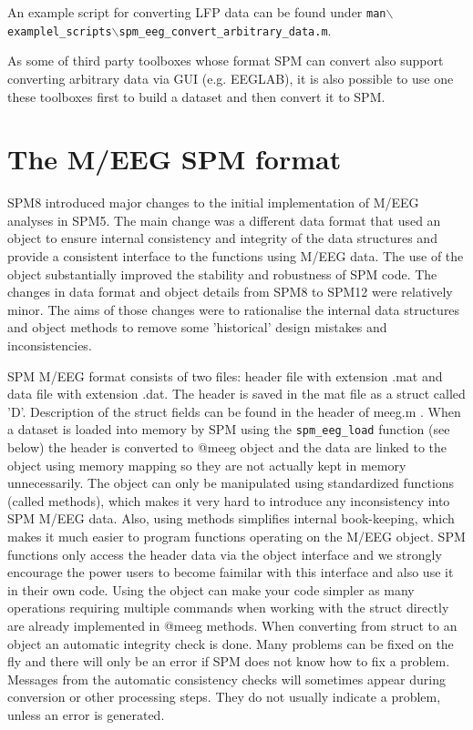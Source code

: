 An example script for converting LFP data can be found under \texttt{man$\backslash$examplel\_scripts$\backslash$spm\_eeg\_convert\_arbitrary\_data.m}.

As some of third party toolboxes whose format SPM can convert also support converting arbitrary data via GUI (e.g. EEGLAB), it is also possible to use one these toolboxes first to build a dataset and then convert it to SPM. 

\section{The M/EEG SPM format}
SPM8 introduced major changes to the initial implementation of M/EEG analyses in SPM5. The main change was a different data format that used an object to ensure internal consistency and integrity of the data structures and provide a consistent interface to the functions using M/EEG data. The use of the object substantially improved  the stability and robustness of SPM code. The changes in data format and object details from SPM8 to SPM12 were relatively minor. The aims of those changes were to rationalise the internal data  structures and object methods to remove some 'historical' design mistakes and inconsistencies.

SPM M/EEG format consists of two files: header file with extension .mat and data file with extension .dat. The header is saved in the mat file as a struct called 'D'. Description of the struct fields can be found in the header of meeg.m . When a dataset is loaded into memory by SPM using the \texttt{spm\_eeg\_load} function (see below) the header is converted to @meeg object and the data are linked to the object using memory mapping so they are not actually kept in memory unnecessarily. The object can only be manipulated using standardized functions (called methods), which makes it very hard to introduce any inconsistency into SPM M/EEG data. Also, using methods simplifies internal book-keeping, which makes it much easier to program functions operating on the M/EEG object. SPM functions only access the header data via the object interface and we strongly encourage the power users to become faimilar with this interface and also use it in their own code. Using the object can make your code simpler as many operations requiring multiple commands when working with the struct directly are already implemented in @meeg methods.  When converting from struct to an object an automatic integrity check is done. Many problems can be fixed on the fly and there will only be an error if SPM does not know how to fix a problem. Messages from the automatic consistency checks will sometimes appear during conversion or other processing steps. They do not usually indicate a problem, unless an error is generated. 


